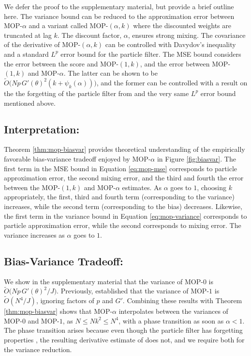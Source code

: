\documentclass[numsec,webpdf,modern,medium,namedate]{oup-authoring-template}
\newcommand\arxiv[2]{#2} %
\theoremstyle{thmstyleone}%
\theoremstyle{thmstyletwo}%
\theoremstyle{thmstylethree}%
\begin{document}
We defer the proof to \arxiv{Appendix~\ref{appendix:biasvar}}{the supplementary material}, but provide a brief outline here. 
The variance bound can be reduced to the approximation error between MOP-$\alpha$ and a variant called MOP-$(\alpha,k)$ where the discounted weights are truncated at lag $k$. 
The discount factor, $\alpha$, ensures strong mixing.
The covariance of the derivative of MOP-$(\alpha,k)$ can be controlled with Davydov's inequality and a standard $L^p$ error bound for the particle filter. 
The MSE bound considers the error between the score and MOP-$(1,k)$, and the error between MOP-$(1,k)$ and MOP-$\alpha$. 
The latter can be shown to be $\tilde{O}\big(Np \, G'(\theta)^2(k+\psi_k(\alpha))\big)$, and the former can be controlled with a result on the the forgetting of the particle filter from \cite{karjalainen23} and the very same $L^p$ error bound mentioned above. 


\subsection{Interpretation:} Theorem \ref{thm:mop-biasvar} provides theoretical understanding of the empirically favorable bias-variance tradeoff enjoyed by MOP-$\alpha$ in Figure \ref{fig:biasvar}.
The first term in the MSE bound in Equation \ref{eq:mop-mse} corresponds to particle approximation error, the second mixing error, and the third and fourth the error between the MOP-$(1,k)$ and MOP-$\alpha$ estimates. 
As $\alpha$ goes to $1$, choosing $k$ appropriately, the first, third and fourth term (corresponding to the variance) increases, while the second term (corresponding to the bias) decreases. 
Likewise, the first term in the variance bound in Equation \ref{eq:mop-variance} corresponds to particle approximation error, while the second corresponds to mixing error. 
The variance increases as $\alpha$ goes to $1$. 


\subsection{Bias-Variance Tradeoff:} We show in \arxiv{Appendix~\ref{appendix:biasvar}}{the supplementary material} that the variance of MOP-$0$ is $\tilde{O}\big( Np \, G'(\theta)^2\big/J \big)$.
Previously, \cite{poyiadjis11} established that the variance of MOP-$1$ is $\tilde{O}(N^4/J)$, ignoring factors of $p$ and $G'$. 
Combining these results with Theorem \ref{thm:mop-biasvar} shows that MOP-$\alpha$ interpolates between the variances of MOP-$0$ and MOP-$1$, as $N \leq Nk^2 \leq N^4$, with a phase transition as soon as $\alpha<1$. 
The phase transition arises because even though the particle filter has forgetting properties \citep{karjalainen23}, the resulting derivative estimate of \cite{poyiadjis11} does not, and we require both for the variance reduction. 
\end{document}
